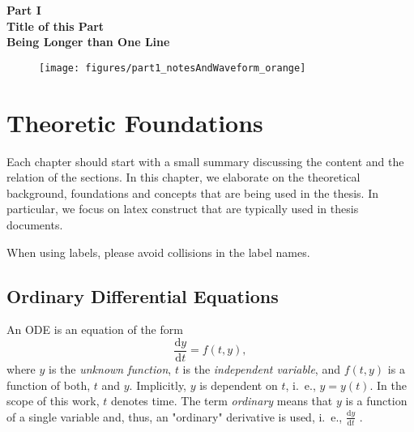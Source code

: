 \cleardoublepage
\thispagestyle{empty}
\begin{center}
\vspace*{3cm}
{\huge \bf Part I}\\ \vspace*{1cm}
{\Huge \bf Title of this Part}\\\vspace*{0.2cm}
{\Huge \bf Being Longer than One Line}\\\vspace*{3cm}
\begin{figure}[ht]
\centering
\texttt{[image: figures/part1\_notesAndWaveform\_orange]}
\end{figure}
\end{center}
\label{par:part1}
\newpage
\quad
\thispagestyle{empty}
\newpage



\chapter{Theoretic Foundations}
\label{chapter:Foundations}

Each chapter should start with a small summary discussing the content and the relation
of the sections. In this chapter, we elaborate on the theoretical background, 
foundations and concepts that are being used in the thesis. In particular, we 
focus on latex construct that are typically used in thesis documents.

When using labels, please avoid collisions in the label names.


\section{Ordinary Differential Equations}
\label{section:ode}

An \ac{ODE} is an equation of the form
\begin{equation}
  \frac{\mathrm{d} y}{\mathrm{d} t} = f(t, y),
  \label{eq:general_ode}
\end{equation}
where $y$ is the \emph{unknown function}, $t$ is the \emph{independent variable}, and $f(t, y)$ is a function of both, $t$ and $y$. Implicitly, $y$ is dependent on $t$, i.\ e., $y = y(t)$. In the scope of this work, $t$ denotes time. The term \emph{ordinary} means that $y$ is a function of a single variable and, thus, an "ordinary" derivative is used, i.\ e., $\frac{\mathrm{d} y}{\mathrm{d} t}$ \cite{Gockenbach2011}.

